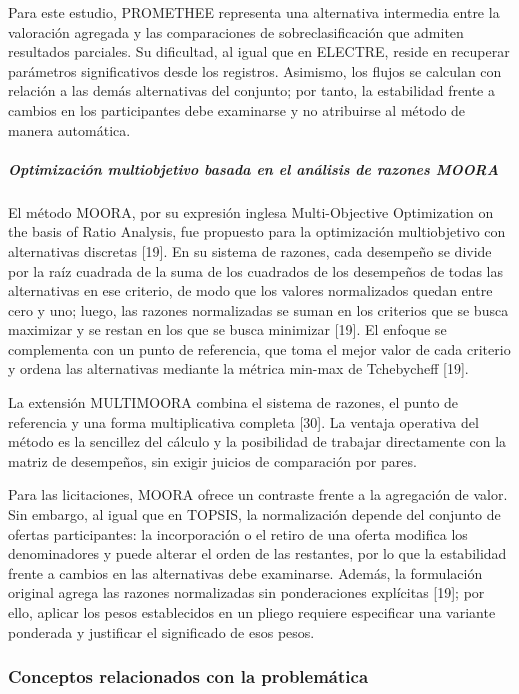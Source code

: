 \documentclass[12pt,a4paper]{article}
\begin{document}
Para este estudio, PROMETHEE representa una alternativa intermedia entre la valoración agregada y las comparaciones de sobreclasificación que admiten resultados parciales. Su dificultad, al igual que en ELECTRE, reside en recuperar parámetros significativos desde los registros. Asimismo, los flujos se calculan con relación a las demás alternativas del conjunto; por tanto, la estabilidad frente a cambios en los participantes debe examinarse y no atribuirse al método de manera automática.

\subparagraph{Optimización multiobjetivo basada en el análisis de razones MOORA}

El método MOORA, por su expresión inglesa Multi-Objective Optimization on the basis of Ratio Analysis, fue propuesto para la optimización multiobjetivo con alternativas discretas [19]. En su sistema de razones, cada desempeño se divide por la raíz cuadrada de la suma de los cuadrados de los desempeños de todas las alternativas en ese criterio, de modo que los valores normalizados quedan entre cero y uno; luego, las razones normalizadas se suman en los criterios que se busca maximizar y se restan en los que se busca minimizar [19]. El enfoque se complementa con un punto de referencia, que toma el mejor valor de cada criterio y ordena las alternativas mediante la métrica min-max de Tchebycheff [19].

La extensión MULTIMOORA combina el sistema de razones, el punto de referencia y una forma multiplicativa completa [30]. La ventaja operativa del método es la sencillez del cálculo y la posibilidad de trabajar directamente con la matriz de desempeños, sin exigir juicios de comparación por pares.

Para las licitaciones, MOORA ofrece un contraste frente a la agregación de valor. Sin embargo, al igual que en TOPSIS, la normalización depende del conjunto de ofertas participantes: la incorporación o el retiro de una oferta modifica los denominadores y puede alterar el orden de las restantes, por lo que la estabilidad frente a cambios en las alternativas debe examinarse. Además, la formulación original agrega las razones normalizadas sin ponderaciones explícitas [19]; por ello, aplicar los pesos establecidos en un pliego requiere especificar una variante ponderada y justificar el significado de esos pesos.

\subsubsection{Conceptos relacionados con la problemática}
\end{document}
